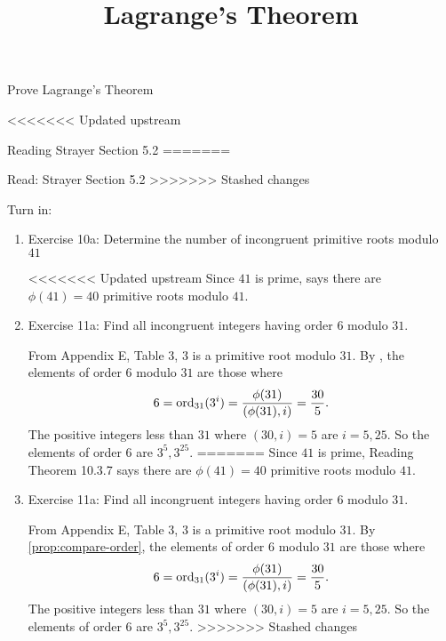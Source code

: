 \documentclass{ximera}
\title{Lagrange's Theorem}
\begin{document}
\begin{abstract}
\end{abstract}
\maketitle

\begin{obj}
    \item Prove Lagrange's Theorem
\end{obj}


<<<<<<< Updated upstream
\begin{instructorNotes}
    
\begin{pre}
    \item[Reading] Strayer Section 5.2
=======
\begin{pre}
    \item[Read:] Strayer Section 5.2
>>>>>>> Stashed changes
    \item[Turn in:] 
    
    \begin{enumerate}
        \item Exercise 10a: Determine the number of incongruent primitive roots modulo $41$
        \begin{solution}
<<<<<<< Updated upstream
            Since $41$ is prime,  says there are $\phi(41)=40$ primitive roots modulo $41.$
        \end{solution}
        \item Exercise 11a: Find all incongruent integers having order $6$ modulo $31.$
        \begin{solution}
                From Appendix E, Table 3, $3$ is a primitive root modulo $31.$ By , the elements of order $6$ modulo $31$ are those where \[6=\operatorname{ord}_{31}(3^i)=\frac{\phi(31)}{(\phi(31),i)}=\frac{30}{5}.\] The positive integers less than $31$ where $(30,i)=5$ are $i=5,25.$ So the elements of order $6$ are $3^5, 3^{25}.$
=======
            Since $41$ is prime, Reading Theorem 10.3.7 says there are $\phi(41)=40$ primitive roots modulo $41.$
        \end{solution}
        \item Exercise 11a: Find all incongruent integers having order $6$ modulo $31.$
        \begin{solution}
                From Appendix E, Table 3, $3$ is a primitive root modulo $31.$ By \cref{prop:compare-order}, the elements of order $6$ modulo $31$ are those where \[6=\operatorname{ord}_{31}(3^i)=\frac{\phi(31)}{(\phi(31),i)}=\frac{30}{5}.\] The positive integers less than $31$ where $(30,i)=5$ are $i=5,25.$ So the elements of order $6$ are $3^5, 3^{25}.$
>>>>>>> Stashed changes
                


\end{solution}
\end{enumerate}
\end{pre}
\end{pre}
\end{instructorNotes}
\end{document}
